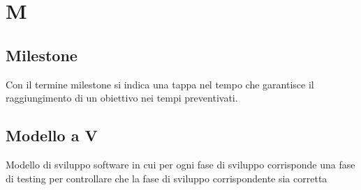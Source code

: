 \section{M}
	\subsection{Milestone}  
		Con il termine milestone si indica una tappa nel tempo che garantisce il raggiungimento di un obiettivo nei tempi preventivati.
	\subsection{Modello a V}  
		Modello di sviluppo software in cui per ogni fase di sviluppo corrisponde una fase di testing per controllare che la fase di sviluppo corrispondente sia corretta


\newpage